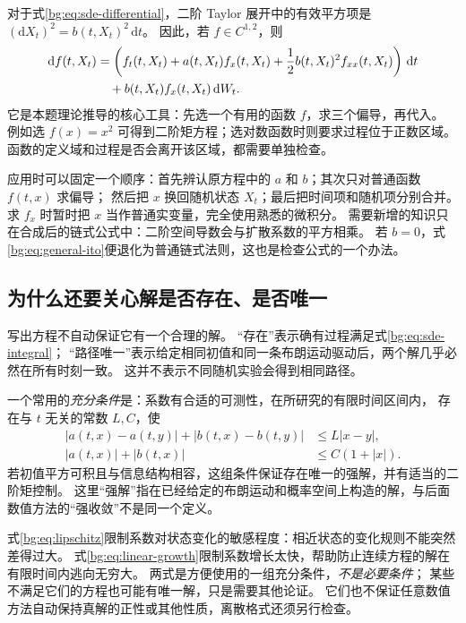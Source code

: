 \documentclass[11pt,a4paper,fontset=none]{ctexart}
\numberwithin{equation}{section}
\begin{document}
对于式\eqref{bg:eq:sde-differential}，二阶 Taylor 展开中的有效平方项是
$(\mathrm dX_t)^2=b(t,X_t)^2\,\mathrm dt$。
因此，若 $f\in C^{1,2}$，则
\begin{align}
  \mathrm df(t,X_t)
  &=\left(f_t(t,X_t)+a(t,X_t)f_x(t,X_t)
          +\frac12 b(t,X_t)^2f_{xx}(t,X_t)\right)\,\mathrm dt
  \notag\\
  &\quad+b(t,X_t)f_x(t,X_t)\,\mathrm dW_t.
  \label{bg:eq:general-ito}
\end{align}
它是本题理论推导的核心工具：先选一个有用的函数 $f$，求三个偏导，再代入。
例如选 $f(x)=x^2$ 可得到二阶矩方程；选对数函数时则要求过程位于正数区域。
函数的定义域和过程是否会离开该区域，都需要单独检查。

应用时可以固定一个顺序：首先辨认原方程中的 $a$ 和 $b$；其次只对普通函数 $f(t,x)$ 求偏导；
然后把 $x$ 换回随机状态 $X_t$；最后把时间项和随机项分别合并。
求 $f_x$ 时暂时把 $x$ 当作普通实变量，完全使用熟悉的微积分。
需要新增的知识只在合成后的链式公式中：二阶空间导数会与扩散系数的平方相乘。
若 $b=0$，式\eqref{bg:eq:general-ito}便退化为普通链式法则，这也是检查公式的一个办法。

\subsection{为什么还要关心解是否存在、是否唯一}
\label{bg:sub:existence}

写出方程不自动保证它有一个合理的解。
“存在”表示确有过程满足式\eqref{bg:eq:sde-integral}；
“路径唯一”表示给定相同初值和同一条布朗运动驱动后，两个解几乎必然在所有时刻一致。
这并不表示不同随机实验会得到相同路径。

一个常用的\emph{充分条件}是：系数有合适的可测性，在所研究的有限时间区间内，
存在与 $t$ 无关的常数 $L,C$，使
\begin{align}
 |a(t,x)-a(t,y)|+|b(t,x)-b(t,y)|&\leq L|x-y|,
 \label{bg:eq:lipschitz}\\
 |a(t,x)|+|b(t,x)|&\leq C(1+|x|).
 \label{bg:eq:linear-growth}
\end{align}
若初值平方可积且与信息结构相容，这组条件保证存在唯一的强解，并有适当的二阶矩控制。
这里“强解”指在已经给定的布朗运动和概率空间上构造的解，与后面数值方法的“强收敛”不是同一个定义。

式\eqref{bg:eq:lipschitz}限制系数对状态变化的敏感程度：相近状态的变化规则不能突然差得过大。
式\eqref{bg:eq:linear-growth}限制系数增长太快，帮助防止连续方程的解在有限时间内逃向无穷大。
两式是方便使用的一组充分条件，\emph{不是必要条件}；
某些不满足它们的方程也可能有唯一解，只是需要其他论证。
它们也不保证任意数值方法自动保持真解的正性或其他性质，离散格式还须另行检查。
\end{document}
